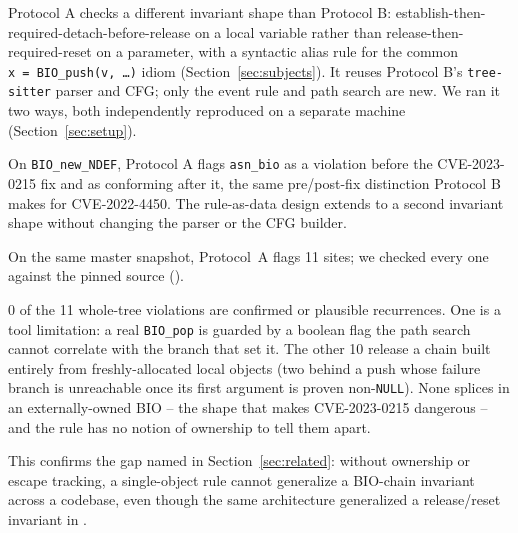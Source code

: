 Protocol A checks a different invariant shape than Protocol B:
establish-then-required-detach-before-release on a local variable rather
than release-then-required-reset on a parameter, with a syntactic alias
rule for the common \texttt{x~=~BIO\_push(v,~\ldots{})} idiom
(Section~\ref{sec:subjects}). It reuses Protocol B's \texttt{tree-sitter}
parser and CFG; only the event rule and path search are new. We ran it
two ways, both independently reproduced on a separate machine
(Section~\ref{sec:setup}).

\begin{observation}
\label{obs:rq5-protocola-motivating}
On \texttt{BIO\_new\_NDEF}, Protocol A flags \texttt{asn\_bio} as a
violation before the CVE-2023-0215 fix and as conforming after it, the
same pre/post-fix distinction Protocol B makes for CVE-2022-4450. The
rule-as-data design extends to a second invariant shape without changing
the parser or the CFG builder.
\end{observation}

On the same master snapshot, Protocol~A flags 11 sites; we checked every
one against the pinned source ().

\begin{observation}
\label{obs:rq5-protocola-master}
0 of the 11 whole-tree violations are confirmed or plausible recurrences.
One is a tool limitation: a real \texttt{BIO\_pop} is guarded by a boolean
flag the path search cannot correlate with the branch that set it. The
other 10 release a chain built entirely from freshly-allocated local
objects (two behind a push whose failure branch is unreachable once its
first argument is proven non-\texttt{NULL}). None splices in an
externally-owned BIO -- the shape that makes CVE-2023-0215 dangerous -- and
the rule has no notion of ownership to tell them apart.
\end{observation}

This confirms the gap named in Section~\ref{sec:related}: without ownership
or escape tracking, a single-object rule cannot generalize a BIO-chain
invariant across a codebase, even though the same architecture generalized
a release/reset invariant in .
